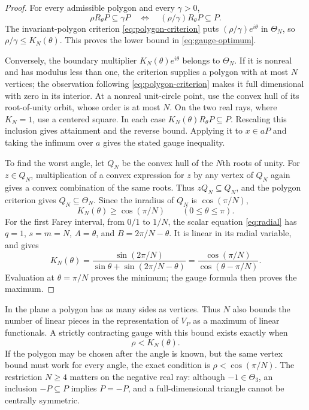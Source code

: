 \documentclass[11pt,a4paper]{article}
\theoremstyle{definition}
\theoremstyle{remark}
\numberwithin{equation}{section}
\begin{document}
\begin{proof}
For every admissible polygon and every $\gamma>0$,
\[
 \rho R_\theta P\subseteq\gamma P
 \quad\Longleftrightarrow\quad
 (\rho/\gamma)R_\theta P\subseteq P.
\]
The invariant-polygon criterion \eqref{eq:polygon-criterion} puts
$(\rho/\gamma)e^{i\theta}$ in $\Theta_N$, so
$\rho/\gamma\le K_N(\theta)$.  This proves the lower bound in
\eqref{eq:gauge-optimum}.

Conversely, the boundary multiplier $K_N(\theta)e^{i\theta}$ belongs
to $\Theta_N$.  If it is nonreal and has modulus less than one, the
criterion supplies a polygon with at most $N$ vertices; the observation
following \eqref{eq:polygon-criterion} makes it full dimensional with
zero in its interior.  At a nonreal unit-circle point, use the convex
hull of its root-of-unity orbit, whose order is at most $N$.  On the two
real rays, where $K_N=1$, use a centered square.  In each case
$K_N(\theta)R_\theta P\subseteq P$.  Rescaling this inclusion gives
attainment and the reverse bound.  Applying it to $x\in aP$ and taking
the infimum over $a$ gives the stated gauge inequality.

To find the worst angle, let $Q_N$ be the convex hull of the $N$th
roots of unity.  For $z\in Q_N$, multiplication of a convex expression
for $z$ by any vertex of $Q_N$ again gives a convex combination of the
same roots.  Thus $zQ_N\subseteq Q_N$, and the polygon criterion gives
$Q_N\subseteq\Theta_N$.  Since the inradius of $Q_N$ is $\cos(\pi/N)$,
\[
 K_N(\theta)\ge\cos(\pi/N)\qquad(0\le\theta\le\pi).
\]
For the first Farey interval, from $0/1$ to $1/N$, the scalar equation
\eqref{eq:radial} has $q=1$, $s=m=N$, $A=\theta$, and
$B=2\pi/N-\theta$.  It is linear in its radial variable, and gives
\[
 K_N(\theta)=
 \frac{\sin(2\pi/N)}{\sin\theta+\sin(2\pi/N-\theta)}
 =\frac{\cos(\pi/N)}{\cos(\theta-\pi/N)}.
\]
Evaluation at $\theta=\pi/N$ proves the minimum; the gauge formula
then proves the maximum.
\end{proof}

In the plane a polygon has as many sides as vertices.  Thus $N$ also
bounds the number of linear pieces in the representation of $V_P$ as a
maximum of linear functionals.  A strictly contracting gauge with this
bound exists exactly when
\[
 \rho<K_N(\theta).
\]
If the polygon may be chosen after the angle is known, but the same
vertex bound must work for every angle, the exact condition is
$\rho<\cos(\pi/N)$.  The restriction $N\ge4$ matters on the negative
real ray: although $-1\in\Theta_3$, an inclusion $-P\subseteq P$ implies
$P=-P$, and a full-dimensional triangle cannot be centrally symmetric.
\end{document}
